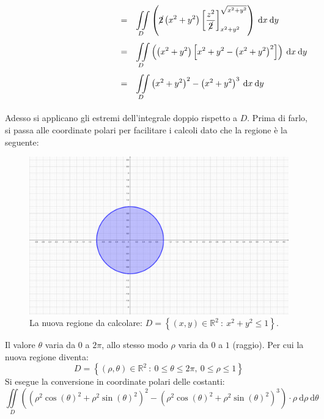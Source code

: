 \documentclass[a4paper]{article}
\begin{document}
	\begin{equation*}
		\begin{array}{rcl}
			\phantom{\displaystyle\iiint\limits_{\Omega} 2\left(x^{2}+y^{2}\right)z \:\mathrm{d}x\:\mathrm{d}y\:\mathrm{d}z}
			&=&
			\displaystyle\iint\limits_{D} \left(\cancel{2}\left(x^{2}+y^{2}\right) \left[\dfrac{z^{2}}{\cancel{2}}\right]_{x^{2}+y^{2}}^{\sqrt{x^{2}+y^{2}}}\right) \:\mathrm{d}x\:\mathrm{d}y \\ [2em]
			&=&
			\displaystyle\iint\limits_{D} \left(\left(x^{2}+y^{2}\right) \left[x^{2}+y^{2} - \left(x^{2}+y^{2}\right)^{2}\right]\right) \:\mathrm{d}x\:\mathrm{d}y \\ [2em]
			&=&
			\displaystyle\iint\limits_{D} \left(x^{2}+y^{2}\right)^{2} - \left(x^{2}+y^{2}\right)^{3} \:\mathrm{d}x\:\mathrm{d}y \\ [2em]
		\end{array}
	\end{equation*}
	Adesso si applicano gli estremi dell'integrale doppio rispetto a $D$. Prima di farlo, si passa alle coordinate polari per facilitare i calcoli dato che la regione è la seguente:
	\begin{figure}[!htp]
		\centering
		\includegraphics[width=.7\textwidth]{img/integrazione_per_fili_4.pdf}
		\caption{La nuova regione da calcolare: $D = \left\{\left(x,y\right) \in \mathbb{R}^{2} \: : \: x^{2} + y^{2} \le 1\right\}$.}
	\end{figure}

	\noindent
	Il valore $\theta$ varia da $0$ a $2\pi$, allo stesso modo $\rho$ varia da $0$ a $1$ (raggio). Per cui la nuova regione diventa:
	\begin{equation*}
		D = \left\{\left(\rho,\theta\right) \in \mathbb{R}^{2} \: : \: 0 \le \theta \le 2\pi, \: 0 \le \rho \le 1\right\}
	\end{equation*}
	Si esegue la conversione in coordinate polari delle costanti:
	\begin{equation*}
		\displaystyle\iint\limits_{D} \left(\left(\rho^{2}\cos\left(\theta\right)^{2}+\rho^{2}\sin\left(\theta\right)^{2}\right)^{2} - \left(\rho^{2}\cos\left(\theta\right)^{2}+\rho^{2}\sin\left(\theta\right)^{2}\right)^{3}\right) \cdot \rho \:\mathrm{d}\rho\:\mathrm{d}\theta
	\end{equation*}\newpage
\end{document}
